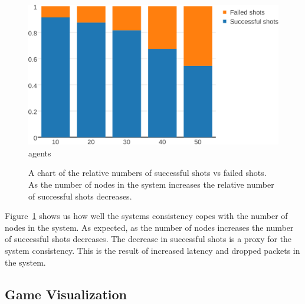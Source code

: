 	\begin{figure}[ht]
	\centering
		\includegraphics[width=0.95\linewidth]{../images/agents-vs-consistency-via-shots-crop.pdf}
		agents
		\caption{\label{figure:nodes-vs-shots-consistency} A chart of the relative numbers of successful shots vs failed shots. As the number of nodes in the system increases the relative number of successful shots decreases.}
	\end{figure}
Figure~\ref{figure:nodes-vs-shots-consistency} shows us how well the systems consistency copes with the number of nodes in the system. As expected, as the number of nodes increases the number of successful shots decreases. The decrease in successful shots is a proxy for the system consistency. 
This is the result of increased latency and dropped packets in the system. 

\subsection{Game Visualization}

